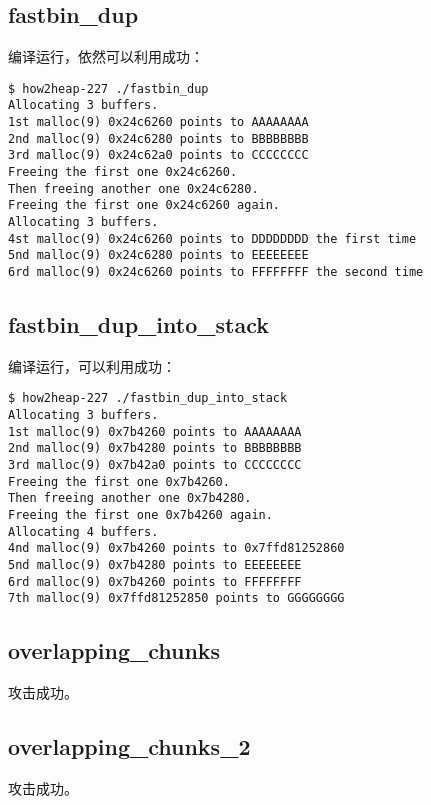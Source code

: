 \subsection{fastbin\_dup}

编译运行，依然可以利用成功：
\begin{verbatim}
$ how2heap-227 ./fastbin_dup            
Allocating 3 buffers.
1st malloc(9) 0x24c6260 points to AAAAAAAA
2nd malloc(9) 0x24c6280 points to BBBBBBBB
3rd malloc(9) 0x24c62a0 points to CCCCCCCC
Freeing the first one 0x24c6260.
Then freeing another one 0x24c6280.
Freeing the first one 0x24c6260 again.
Allocating 3 buffers.
4st malloc(9) 0x24c6260 points to DDDDDDDD the first time
5nd malloc(9) 0x24c6280 points to EEEEEEEE
6rd malloc(9) 0x24c6260 points to FFFFFFFF the second time

\end{verbatim}

\subsection{fastbin\_dup\_into\_stack}

编译运行，可以利用成功：
\begin{verbatim}
$ how2heap-227 ./fastbin_dup_into_stack 
Allocating 3 buffers.
1st malloc(9) 0x7b4260 points to AAAAAAAA
2nd malloc(9) 0x7b4280 points to BBBBBBBB
3rd malloc(9) 0x7b42a0 points to CCCCCCCC
Freeing the first one 0x7b4260.
Then freeing another one 0x7b4280.
Freeing the first one 0x7b4260 again.
Allocating 4 buffers.
4nd malloc(9) 0x7b4260 points to 0x7ffd81252860
5nd malloc(9) 0x7b4280 points to EEEEEEEE
6rd malloc(9) 0x7b4260 points to FFFFFFFF
7th malloc(9) 0x7ffd81252850 points to GGGGGGGG

\end{verbatim}

\subsection{overlapping\_chunks}

攻击成功。

\subsection{overlapping\_chunks\_2}

攻击成功。
\newpage
